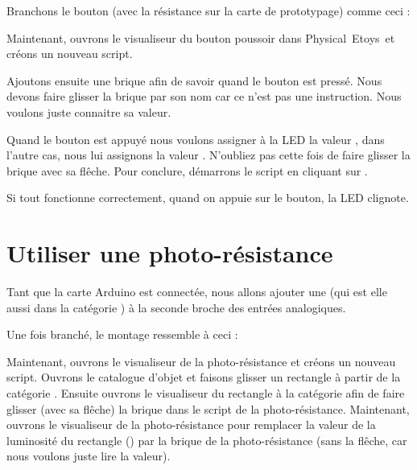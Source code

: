 \documentclass[french]{etoys-guide}
\def\appName{Physical~Etoys~}
\begin{document}
Branchons le bouton (avec la résistance sur la carte de prototypage) comme
ceci :



Maintenant, ouvrons le visualiseur du bouton poussoir dans \appName et créons un nouveau
script.


Ajoutons ensuite une brique \testtile{} afin de savoir quand le bouton est
pressé. Nous devons faire glisser la brique par son nom car ce n'est pas une
instruction. Nous voulons juste connaitre sa valeur.


Quand le bouton est appuyé nous voulons assigner à la LED la valeur
, dans l'autre cas, nous lui assignons la valeur . N'oubliez pas
cette fois de faire glisser la brique avec sa  flêche. Pour conclure,
démarrons le script en cliquant sur .


Si tout fonctionne correctement, quand on appuie sur le bouton, la LED clignote.

\section{Utiliser une photo-résistance}

Tant que la carte Arduino est connectée, nous allons ajouter une
 (qui est elle aussi dans la catégorie ) à la seconde
broche des entrées analogiques.


Une fois branché, le montage ressemble à ceci :



Maintenant, ouvrons le visualiseur de la photo-résistance et créons un nouveau
script. Ouvrons le catalogue d'objet et faisons glisser un rectangle à partir
de la catégorie . Ensuite ouvrons le visualiseur du rectangle à la catégorie  
afin de faire glisser (avec sa  flêche) la brique  dans le script de la
photo-résistance. Maintenant, ouvrons le visualiseur de la photo-résistance pour
remplacer la valeur de la luminosité du rectangle () par la brique
 de la  photo-résistance (sans la flêche, car nous voulons
juste lire la valeur).
\end{document}

